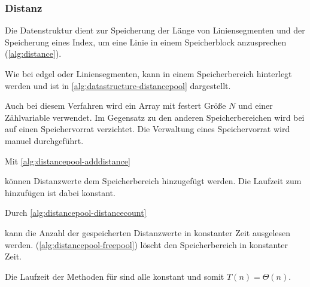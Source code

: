 \subsubsection{Distanz} %
\label{sub:distanz}

Die Datenstruktur  dient zur Speicherung der Länge von Liniensegmenten und der Speicherung eines
 Index, um eine Linie in einem Speicherblock anzusprechen (\autoref{alg:distance}).


Wie bei \gls{edgel} oder Liniensegmenten, kann  in einem Speicherbereich hinterlegt werden und ist
 in \autoref{alg:datastructure-distancepool} dargestellt.

Auch bei diesem Verfahren wird ein Array mit festert Größe $N$ und einer Zählvariable verwendet. Im Gegensatz zu den
 anderen Speicherbereichen wird bei  auf einen Speichervorrat verzichtet. Die Verwaltung eines
 Speichervorrat wird manuel durchgeführt.

% 
% 

Mit \autoref{alg:distancepool-adddistance}

können Distanzwerte dem Speicherbereich hinzugefügt werden. Die Laufzeit zum hinzufügen ist dabei
 konstant.

Durch \autoref{alg:distancepool-distancecount}

 kann die Anzahl der gespeicherten Distanzwerte in konstanter Zeit ausgelesen werden. 
(\autoref{alg:distancepool-freepool}) löscht den Speicherbereich in konstanter Zeit.


Die Laufzeit der Methoden für  sind alle konstant und somit $T(n)=\Theta(n)$.

